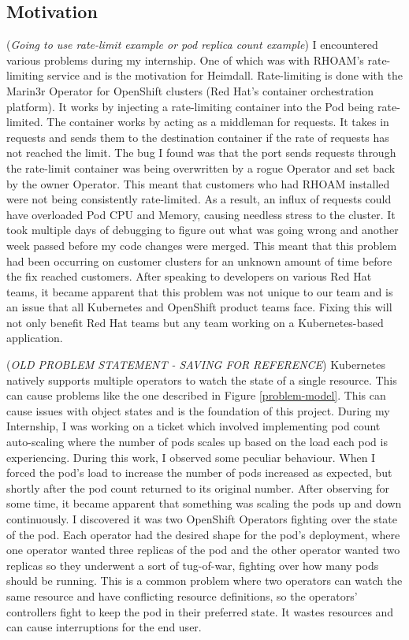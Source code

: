 \documentclass{article}
\begin{document}
\subsection{Motivation} 
(\emph{Going to use rate-limit example or pod replica count example})
I encountered various problems during my internship. One of which was with RHOAM’s rate-limiting service and is the motivation for Heimdall. Rate-limiting is done with the Marin3r Operator for OpenShift clusters (Red Hat’s container orchestration platform). It works by injecting a rate-limiting container into the Pod being rate-limited. The container works by acting as a middleman for requests. It takes in requests and sends them to the destination container if the rate of requests has not reached the limit. The bug I found was that the port sends requests through the rate-limit container was being overwritten by a rogue Operator and set back by the owner Operator. This meant that customers who had RHOAM installed were not being consistently rate-limited. As a result, an influx of requests could have overloaded Pod CPU and Memory, causing needless stress to the cluster. It took multiple days of debugging to figure out what was going wrong and another week passed before my code changes were merged. This meant that this problem had been occurring on customer clusters for an unknown amount of time before the fix reached customers. After speaking to developers on various Red Hat teams, it became apparent that this problem was not unique to our team and is an issue that all Kubernetes and OpenShift product teams face. Fixing this will not only benefit Red Hat teams but any team working on a Kubernetes-based application.



(\emph{OLD PROBLEM STATEMENT - SAVING FOR REFERENCE}) Kubernetes natively supports multiple operators to watch the state of a single resource. This can cause problems like the one described in Figure \ref{problem-model}. This can cause issues with object states and is the foundation of this project. During my Internship, I was working on a ticket which involved implementing pod count auto-scaling where the number of pods scales up based on the load each pod is experiencing. During this work, I observed some peculiar behaviour. When I forced the pod’s load to increase the number of pods increased as expected, but shortly after the pod count returned to its original number. After observing for some time, it became apparent that something was scaling the pods up and down continuously. I discovered it was two OpenShift Operators fighting over the state of the pod. Each operator had the desired shape for the pod’s deployment, where one operator wanted three replicas of the pod and the other operator wanted two replicas so they underwent a sort of tug-of-war, fighting over how many pods should be running. This is a common problem where two operators can watch the same resource and have conflicting resource definitions, so the operators' controllers fight to keep the pod in their preferred state. It wastes resources and can cause interruptions for the end user.
\end{document}

